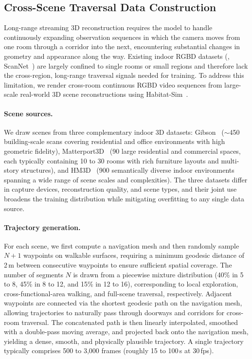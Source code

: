 \subsection{Cross-Scene Traversal Data Construction}
\label{sec:traversal_data}

Long-range streaming 3D reconstruction requires the model to handle continuously expanding observation sequences in which the camera moves from one room through a corridor into the next, encountering substantial changes in geometry and appearance along the way. Existing indoor RGBD datasets (\eg, ScanNet~\cite{dai2017scannet}) are largely confined to single rooms or small regions and therefore lack the cross-region, long-range traversal signals needed for training. To address this limitation, we render cross-room continuous RGBD video sequences from large-scale real-world 3D scene reconstructions using Habitat-Sim~\cite{savva2019habitat}.

\paragraph{Scene sources.}
We draw scenes from three complementary indoor 3D datasets: Gibson~\cite{xia2018gibson} (${\sim}$450 building-scale scans covering residential and office environments with high geometric fidelity), Matterport3D~\cite{chang2017matterport3d} (90 large residential and commercial spaces, each typically containing 10 to 30 rooms with rich furniture layouts and multi-story structures), and HM3D~\cite{ramakrishnan2021hm3d} (900 semantically diverse indoor environments spanning a wide range of scene scales and complexities). The three datasets differ in capture devices, reconstruction quality, and scene types, and their joint use broadens the training distribution while mitigating overfitting to any single data source.

\paragraph{Trajectory generation.}
For each scene, we first compute a navigation mesh and then randomly sample $N{+}1$ waypoints on walkable surfaces, requiring a minimum geodesic distance of 2\,m between consecutive waypoints to ensure sufficient spatial coverage. The number of segments $N$ is drawn from a piecewise mixture distribution (40\% in 5 to 8, 45\% in 8 to 12, and 15\% in 12 to 16), corresponding to local exploration, cross-functional-area walking, and full-scene traversal, respectively. Adjacent waypoints are connected via the shortest geodesic path on the navigation mesh, allowing trajectories to naturally pass through doorways and corridors for cross-room traversal. The concatenated path is then linearly interpolated, smoothed with a double-pass moving average, and projected back onto the navigation mesh, yielding a dense, smooth, and physically plausible trajectory. A single trajectory typically comprises 500 to 3{,}000 frames (roughly 15 to 100\,s at 30\,fps).

